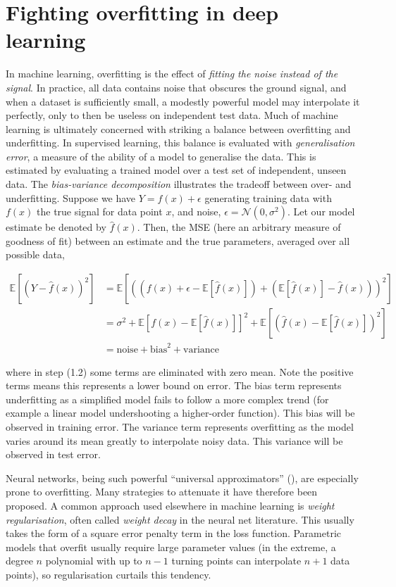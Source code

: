 \section{Fighting overfitting in deep learning}

In machine learning, overfitting is the effect of \emph{fitting the noise instead of the signal}. In practice, all data contains noise that obscures the ground signal, and when a dataset is sufficiently small, a modestly powerful model may interpolate it perfectly, only to then be useless on independent test data. Much of machine learning is ultimately concerned with striking a balance between overfitting and underfitting. In supervised learning, this balance is evaluated with \emph{generalisation error}, a measure of the ability of a model to generalise the data. This is estimated by evaluating a trained model over a test set of independent, unseen data. The \emph{bias-variance decomposition} illustrates the tradeoff between over- and underfitting. Suppose we have $Y = f(x) + \epsilon$ generating training data with $f(x)$ the true signal for data point $x$, and noise, $\epsilon = \mathcal{N}(0, \sigma^2)$. Let our model estimate be denoted by $\hat{f}(x)$. Then, the MSE (here an arbitrary measure of goodness of fit) between an estimate and the true parameters, averaged over all possible data,

\begin{align}
\mathbb{E}[(Y - \hat{f}(x))^2] &= \mathbb{E}[((f(x) + \epsilon - \mathbb{E}[\hat{f}(x)]) + (\mathbb{E}[\hat{f}(x)] - \hat{f}(x)))^2] \\
&= \sigma^2 + \mathbb{E}[f(x) - \mathbb{E}[\hat{f}(x)]]^2 + \mathbb{E}[(\hat{f}(x) - \mathbb{E}[\hat{f}(x)])^2] \\
&= \text{noise} + \text{bias}^2 + \text{variance}
\end{align}

where in step (1.2) some terms are eliminated with zero mean. Note the positive terms means this represents a lower bound on error. The bias term represents underfitting as a simplified model fails to follow a more complex trend (for example a linear model undershooting a higher-order function). This bias will be observed in training error. The variance term represents overfitting as the model varies around its mean greatly to interpolate noisy data. This variance will be observed in test error.

Neural networks, being such powerful ``universal approximators'' (\cite{hornik1989multilayer}), are especially prone to overfitting. Many strategies to attenuate it have therefore been proposed. A common approach used elsewhere in machine learning is \emph{weight regularisation}, often called \emph{weight decay} in the neural net literature. This usually takes the form of a square error penalty term in the loss function. Parametric models that overfit usually require large parameter values (in the extreme, a degree $n$ polynomial with up to $n-1$ turning points can interpolate $n+1$ data points), so regularisation curtails this tendency.

